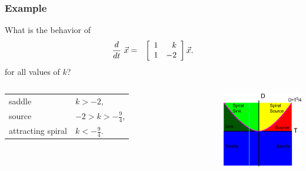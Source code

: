 \begin{frame}
  \frametitle{Example}

  What is the behavior of
  \begin{eqnarray*}
    \deriv{~}{t} \vec{x} & = & \arrayTwo{1}{k}{1}{-2} \vec{x}.
  \end{eqnarray*}
  for all values of $k$?

  \begin{columns}
    \begin{tabular}{ll}
      saddle            & $k>-2$, \\
      source            & $-2 > k  > -\frac{9}{4}$, \\
      attracting spiral & $k < -\frac{9}{4}.$
    \end{tabular}
    \centerline{\includegraphics[width=5cm]{img/traceDeterminantExample5}}
  \end{columns}

\end{frame}


